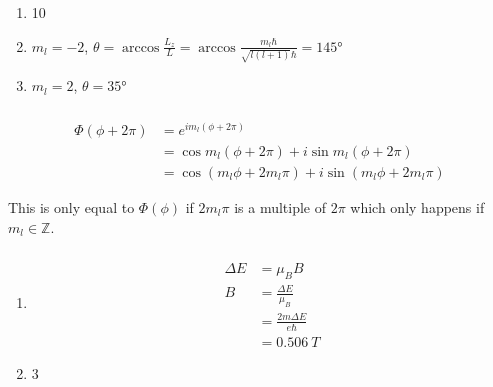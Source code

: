 \documentclass{article}
\begin{document}
\subsubsection{}

\begin{enumerate}
  \item 10

  \item $m_l = -2$, $\theta = \arccos \frac{L_z}{L} = \arccos \frac{m_l \hbar}{\sqrt{l (l + 1)} \hbar} = \ang{145}$

  \item $m_l = 2$, $\theta = \ang{35}$
\end{enumerate}

\setcounter{subsubsection}{16}
\subsubsection{}

\begin{align*}
  \Phi(\phi + 2 \pi) & = e^{i m_l (\phi + 2 \pi)}                                    \\
                     & = \cos m_l (\phi + 2 \pi) + i \sin m_l (\phi + 2 \pi)         \\
                     & = \cos (m_l \phi + 2 m_l \pi) + i \sin (m_l \phi + 2 m_l \pi)
\end{align*}

This is only equal to $\Phi(\phi)$ if $2 m_l \pi$ is a multiple of $2 \pi$ which only happens if $m_l \in \mathbb{Z}$.

\setcounter{subsubsection}{18}
\subsubsection{}

\begin{enumerate}
  \item

        \begin{align*}
          \Delta E & = \mu_B B                      \\
          B        & = \frac{\Delta E}{\mu_B}       \\
                   & = \frac{2 m \Delta E}{e \hbar} \\
                   & = \qty{0.506}{T}
        \end{align*}

  \item $3$
\end{enumerate}
\end{document}
